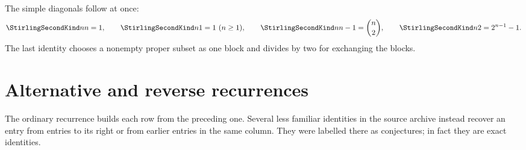 \documentclass[11pt,a4paper,oneside,openany]{book}
\theoremstyle{definition}
\theoremstyle{remark}
\begin{document}
The simple diagonals follow at once:
\begin{equation}\label{eq:second-simple}
 \StirlingSecondKind nn=1,\qquad \StirlingSecondKind n1=1\ (n\ge1),\qquad
 \StirlingSecondKind n{n-1}=\binom n2,\qquad
 \StirlingSecondKind n2=2^{n-1}-1.
\end{equation}
The last identity chooses a nonempty proper subset as one block and divides by two
for exchanging the blocks.


\section{Alternative and reverse recurrences}
The ordinary recurrence builds each row from the preceding one.  Several less
familiar identities in the source archive instead recover an entry from entries to
its right or from earlier entries in the same column.  They were labelled there as
conjectures; in fact they are exact identities.
\end{document}
